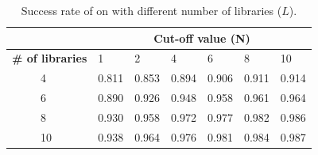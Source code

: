 \begin{table}[ht]
	\footnotesize
	\color{blue}
	\caption{Success rate of \CR on  with different number of libraries ($L$).}
	\centering
	\begin{tabular}{|p{0.75cm}|p{0.75cm}|p{1.0cm}|p{1.0cm}|p{1.0cm}|p{1.0cm}|p{1.0cm}|p{1.0cm}|}\hline
		\multicolumn{2}{|c|}{} & \multicolumn{6}{c|}{\textbf{Cut-off value (N)}}         \\ \hline%
		\multicolumn{2}{|c|}{\textbf{\# of libraries}} & 1	 & 2   & 4    & 6   & 8    &  10          \\ \hline
		{\multirow{4}{*}{$L$}} & 4          & 0.811 & 0.853 & 0.894 & 0.906 & 0.911 & 0.914  \\ \cline{2-8}
		& 6          & 0.890 & 0.926 & 0.948 & 0.958 & 0.961 & 0.964  \\ \cline{2-8}
		& 8          & 0.930 & 0.958 & 0.972 & 0.977 & 0.982 & 0.986  \\ \cline{2-8}
		& 10         & 0.938 & 0.964 & 0.976 & 0.981 & 0.984 & 0.987  \\ \hline
	\end{tabular}
	\label{tab:SuccessRateCrossRecD1}
	\color{black}
\end{table}




